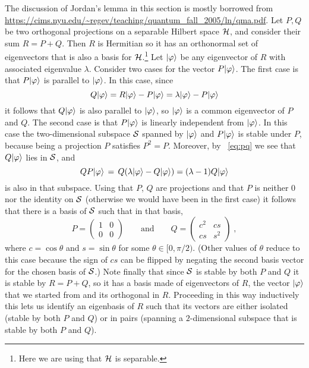 The discussion of Jordan's lemma in this section is mostly borrowed from \url{https://cims.nyu.edu/~regev/teaching/quantum_fall_2005/ln/qma.pdf}. Let $P,Q$ be two orthogonal projections on a separable Hilbert space $\mathcal{H}$, and consider their sum $R=P+Q$. Then $R$ is Hermitian so it has an orthonormal set of eigenvectors that is also a basis for $\mathcal{H}$.\footnote{Here we are using that $\mathcal{H}$ is separable.} Let $|\varphi\rangle$ be  any eigenvector of $R$ with associated eigenvalue $\lambda$. Consider two cases for the vector $P|\varphi\rangle$. The first case is that $P|\varphi\rangle$ is parallel to $|\varphi\rangle$. In this case, since
\begin{equation}\label{eq:pq}
Q|\varphi\rangle = R|\varphi\rangle - P|\varphi\rangle = \lambda |\varphi\rangle - P |\varphi\rangle
\end{equation}
it follows that $Q|\varphi\rangle$ is also parallel to $|\varphi\rangle$, so $|\varphi\rangle$ is a common eigenvector of $P$ and $Q$. The second case is that $P|\varphi\rangle$ is linearly independent from $|\varphi\rangle$. In this case the two-dimensional subspace $\mathcal{S}$ spanned by $|\varphi\rangle$ and $P|\varphi\rangle$ is stable under $P$, because being a projection $P$ satisfies $P^2=P$. Moreover, by
~\eqref{eq:pq} we see that $Q|\varphi\rangle$ lies in $\mathcal{S}$, and  
\[ Q P |\varphi\rangle \,=\, Q (\lambda |\varphi\rangle  - Q |\varphi\rangle) = (\lambda-1)Q |\varphi\rangle\]
is also in that subspace. Using that $P$, $Q$ are projections and that $P$ is neither $0$ nor the identity on $\mathcal{S}$ (otherwise we would have been in the first case) it follows that there is a basis of $\mathcal{S}$ such that in that basis, 
\begin{equation}\label{eq:pq-form}
 P = \begin{pmatrix} 1 & 0 \\ 0 & 0 \end{pmatrix} \qquad \text{and} \qquad Q = \begin{pmatrix} c^2 & cs \\ cs & s^2 \end{pmatrix}\;,
\end{equation}
where $c = \cos\theta$ and $s=\sin\theta$ for some $\theta \in [0,\pi/2)$. (Other values of $\theta$ reduce to this case because the sign of $cs$ can be flipped by negating the second basis vector for the chosen basis of $\mathcal{S}$.) Note finally that since $\mathcal{S}$ is stable by both $P$ and $Q$ it is stable by $R=P+Q$, so it has a basis made of eigenvectors of $R$, the vector $|\varphi\rangle$ that we started from and its orthogonal in $R$. Proceeding in this way inductively this lets us identify an eigenbasis of $R$ such that its vectors are either isolated (stable by both $P$ and $Q$) or in pairs (spanning a $2$-dimensional subspace that is stable by both $P$ and $Q$). 

